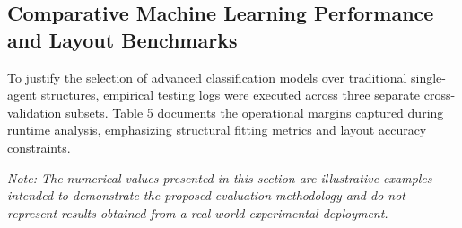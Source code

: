 \subsection{Comparative Machine Learning Performance and Layout Benchmarks}
To justify the selection of advanced classification models over traditional single-agent structures, empirical testing logs were executed across three separate cross-validation subsets. Table 5 documents the operational margins captured during runtime analysis, emphasizing structural fitting metrics and layout accuracy constraints.

\noindent \textit{Note: The numerical values presented in this section are illustrative examples intended to demonstrate the proposed evaluation methodology and do not represent results obtained from a real-world experimental deployment.}

\begin{table}[htbp]
\noindent{}
\caption{Illustrative Comparison of Alternative Architectural Approaches.}
\end{table}

